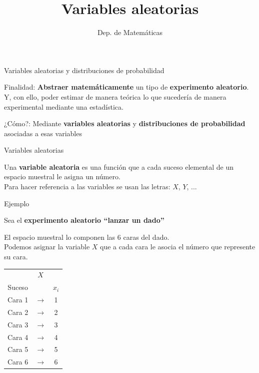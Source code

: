 \documentclass[11pt]{beamer}
\title{Variables aleatorias}
\date{}
\author{Dep. de Matemáticas}
\begin{document}
\begin{frame}
\titlepage
\end{frame}


\begin{frame}{Variables aleatorias y distribuciones de probabilidad}
\begin{block}{Finalidad:} \textbf{Abstraer matemáticamente} un tipo de \textbf{experimento aleatorio}. Y, con ello, poder estimar de manera teórica lo que sucedería de manera experimental mediante una estadística.
\end{block}

\pause

\begin{block}{¿Cómo?:} Mediante \textbf{variables aleatorias} y \textbf{distribuciones de probabilidad} asociadas a esas variables

\end{block}


\end{frame}

\begin{frame}{Variables aleatorias}
\begin{block}{}
Una \textbf{variable aleatoria} es una función que a cada suceso
elemental de un espacio muestral le asigna un número. \\ Para hacer referencia a las variables se usan las letras: $X$, $Y$, ...
\end{block}
\end{frame}

\begin{frame}{Ejemplo}
\begin{block}{}
Sea el \textbf{experimento aleatorio “lanzar un dado”} 
\end{block}
\pause
El espacio muestral lo componen las 6 caras del dado.\\
Podemos asignar la variable $X$ que a cada cara le asocia el número que represente su cara.
\begin{center}
\begin{tabular}{ccc}
 & $X$ &  \\
Suceso &  &  $x_i$\\ \hline 
Cara 1 & $\rightarrow$ & 1 \\ 
Cara 2 & $\rightarrow$ & 2 \\ 
Cara 3 & $\rightarrow$ & 3 \\ 
Cara 4 & $\rightarrow$ & 4 \\ 
Cara 5 & $\rightarrow$ & 5 \\ 
Cara 6 & $\rightarrow$ & 6 \\ 
\end{tabular} 
\end{center}
\end{frame}
\end{document}
